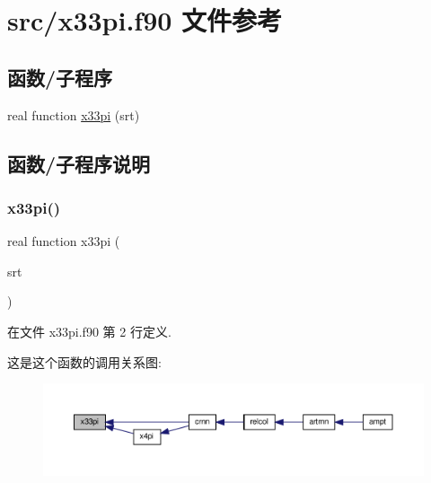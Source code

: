 \hypertarget{x33pi_8f90}{}\section{src/x33pi.f90 文件参考}
\label{x33pi_8f90}
\subsection*{函数/子程序}
\begin{DoxyCompactItemize}
\item 
real function \mbox{\hyperlink{x33pi_8f90_a7633f265079077bb21eb674d0dda1836}{x33pi}} (srt)
\end{DoxyCompactItemize}


\subsection{函数/子程序说明}
\mbox{\label{x33pi_8f90_a7633f265079077bb21eb674d0dda1836}} 
\subsubsection{\texorpdfstring{x33pi()}{x33pi()}}
{\footnotesize\ttfamily real function x33pi (\begin{DoxyParamCaption}\item[{}]{srt }\end{DoxyParamCaption})}



在文件 x33pi.\+f90 第 2 行定义.

这是这个函数的调用关系图\+:
\nopagebreak
\begin{figure}[H]
\begin{center}
\leavevmode
\includegraphics[width=350pt]{x33pi_8f90_a7633f265079077bb21eb674d0dda1836_icgraph}
\end{center}
\end{figure}
